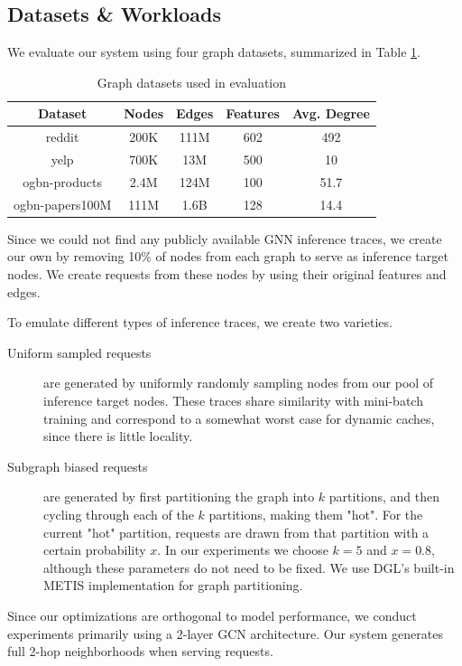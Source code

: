 \subsection{Datasets \& Workloads}
We evaluate our system using four graph datasets, summarized in Table \ref{Eval: Dataset info}.
\begin{table}[h!]
    \begin{center}
        \begin{tabular}{|c c c c c|} 
        \hline
        \textbf{Dataset} & \textbf{Nodes} & \textbf{Edges} & \textbf{Features} & \textbf{Avg. Degree} \\ [0.5ex] 
        \hline\hline
        reddit \cite{GraphSAGE_2017} & 200K & 111M & 602 & 492 \\
        \hline
        yelp \cite{GraphSAINT_2019} & 700K & 13M & 500 & 10 \\
        \hline
        ogbn-products \cite{OGB_2020} & 2.4M & 124M & 100 & 51.7 \\
        \hline
        ogbn-papers100M \cite{OGB_2020} & 111M & 1.6B & 128 & 14.4 \\
        \hline
        \end{tabular}
    \end{center}
    \caption{Graph datasets used in evaluation}
    \label{Eval: Dataset info}
\end{table}
Since we could not find any publicly available GNN inference traces, we create our own by removing 10\% of nodes from each graph to serve as inference target nodes. We create requests from these nodes by using their original features and edges. 

To emulate different types of inference traces, we create two varieties. 
\begin{description}
    \item[Uniform sampled requests] are generated by uniformly randomly sampling nodes from our pool of inference target nodes. These traces share similarity with mini-batch training and correspond to a somewhat worst case for dynamic caches, since there is little locality.
    \item[Subgraph biased requests] are generated by first partitioning the graph into $k$ partitions, and then cycling through each of the $k$ partitions, making them "hot". For the current "hot" partition, requests are drawn from that partition with a certain probability $x$. In our experiments we choose $k=5$ and $x=0.8$, although these parameters do not need to be fixed. We use DGL's built-in METIS \cite{METIS_1998} implementation for graph partitioning.
\end{description}
Since our optimizations are orthogonal to model performance, we conduct experiments primarily using a 2-layer GCN architecture. Our system generates full 2-hop neighborhoods when serving requests.

